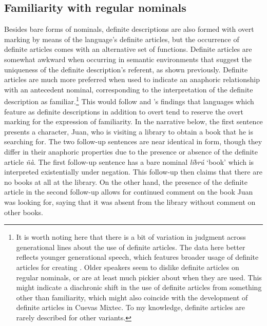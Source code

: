 \documentclass[output=paper,modfonts,nonflat]{langsci/langscibook}
\begin{document}
\subsection{Familiarity with regular nominals} \label{sec:cisneros:4.2}

Besides bare forms of nominals, definite descriptions are also formed with overt marking by means of the language's definite articles, but the occurrence of definite articles comes with an alternative set of functions.  Definite articles are somewhat awkward when occurring in semantic environments that suggest the uniqueness of the definite description's referent, as shown previously.  Definite articles are much more preferred when used to indicate an anaphoric relationship with an antecedent nominal, corresponding to the interpretation of the definite description as familiar.\footnote{It is worth noting here that there is a bit of variation in judgment across generational lines about the use of definite articles.  The data here better reflects younger generational speech, which features broader usage of definite articles for creating .  Older speakers seem to dislike definite articles on regular nominals, or are at least much pickier about when they are used.  This might indicate a diachronic shift in the use of definite articles from something other than familiarity, which might also coincide with the development of definite articles in Cuevas Mixtec.  To my knowledge, definite articles are rarely described for other  variants.}  This would follow \citeauthor{Schwarz2009} and \citeauthor{Jenks2015}'s findings that languages which feature  as definite descriptions in addition to overt  tend to reserve the overt marking for the expression of familiarity.  In the narrative below, the first sentence presents a character, Juan, who is visiting a library to obtain a book that he is searching for.  The two follow-up sentences are near identical in form, though they differ in their anaphoric properties due to the presence or absence of the definite article \emph{\~n\`a}.  The first follow-up sentence has a bare nominal \textit{l\'ibr\'u} `book' which is interpreted existentially under negation.  This follow-up then claims that there are no books at all at the library.  On the other hand, the presence of the definite article in the second follow-up allows for continued comment on the book Juan was looking for, saying that it was absent from the library without comment on other books. 
\end{document}
